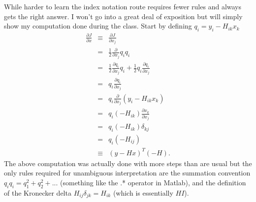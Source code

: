 \documentclass[10pt]{article}
\begin{document}
While harder to learn the index notation route requires fewer rules and always gets the 
right answer.  I won't go into a great deal of exposition but will simply show 
my computation done during the class.  Start by defining $q_i = y_i - H_{ik} x_k$
\begin{eqnarray*}
 \frac{\partial J}{\partial x} & \equiv & \frac{\partial J}{\partial x_j} \\
                               &    =   & \frac{1}{2} \frac{\partial}{\partial x_j} q_i q_i \\
							   &    =   & \frac{1}{2} \frac{\partial q_i}{\partial x_j} q_i+ \frac{1}{2} q_i \frac{\partial q_i}{\partial x_j} \\
							   &    =   & q_i \frac{\partial q_i}{\partial x_j} \\
							   &    =   & q_i \frac{\partial }{\partial x_j} ( y_i - H_{ik} x_k ) \\
							   &    =   & q_i (-H_{ik}) \frac{\partial x_k}{\partial x_j} \\
							   &    =   & q_i (-H_{ik}) \delta_{kj} \\
							   &    =   & q_i (-H_{ij}) \\
							   & \equiv & (y - H x)^T (-H).
\end{eqnarray*}							   
The above computation was actually done with more steps than are usual but the only rules required for unambiguous 
interpretation are the summation convention $q_i q_i = q_1^2 + q_2^2 + ...$ (something like the .* operator in Matlab),
and the definition of the Kronecker delta $H_{ij} \delta_{jk} = H_{ik}$ (which is essentially $ H I $).  
\end{document}
